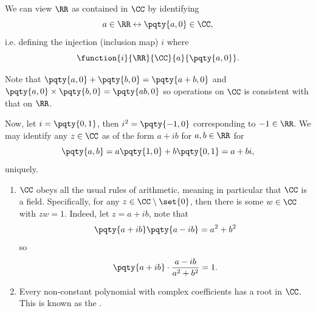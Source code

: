 We can view \(\RR\) as contained in \(\CC\) by identifying
\[
    a \in \RR \leftrightarrow \pqty{a, 0} \in \CC,
\]
i.e. defining the injection (inclusion map) \(i\) where
\[
    \function{i}{\RR}{\CC}{a}{\pqty{a, 0}}.  
\]

Note that \(\pqty{a, 0} + \pqty{b, 0} = \pqty{a + b, 0}\) and \(\pqty{a, 0} \times \pqty{b, 0} = \pqty{ab, 0}\) so operations on \(\CC\) is consistent with that on \(\RR\).

Now, let \(i = \pqty{0, 1}\), then \(i^2 = \pqty{-1, 0}\) corresponding to \(-1 \in \RR\). We may identify any \(z \in \CC\) as of the form \(a + ib\) for \(a, b \in \RR\) for
\[
    \pqty{a, b} = a \pqty{1, 0} + b \pqty{0, 1} = a + bi,
\]
uniquely.

\begin{remarks}
    \begin{enumerate}
        \item \(\CC\) obeys all the usual rules of arithmetic, meaning in particular that \(\CC\) is a field. Specifically, for any \(z \in \CC \setminus \set{0}\), then there is some \(w \in \CC\) with \(zw = 1\). Indeed, let \(z = a + ib\), note that
        \[
            \pqty{a + ib} \pqty{a - ib} = a^2 + b^2
        \]
        so
        \[
            \pqty{a + ib} \cdot \frac{a - ib}{a^2 + b^2} = 1.
        \]

        \item Every non-constant polynomial with complex coefficients has a root in \(\CC\). This is known as the .
    \end{enumerate}
\end{remarks}